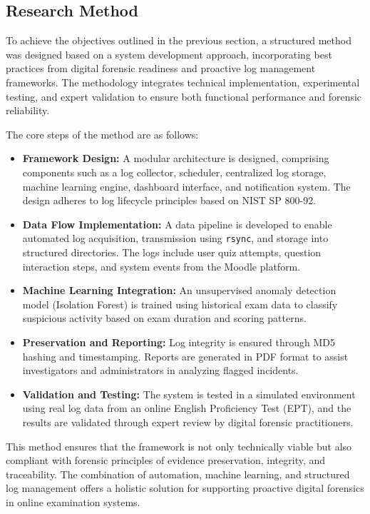 \subsection{Research Method}
To achieve the objectives outlined in the previous section, a structured method was designed based on a system development approach, incorporating best practices from digital forensic readiness and proactive log management frameworks. The methodology integrates technical implementation, experimental testing, and expert validation to ensure both functional performance and forensic reliability.

The core steps of the method are as follows:

\begin{itemize}
	\item \textbf{Framework Design:} A modular architecture is designed, comprising components such as a log collector, scheduler, centralized log storage, machine learning engine, dashboard interface, and notification system. The design adheres to log lifecycle principles based on NIST SP 800-92.
	\item \textbf{Data Flow Implementation:} A data pipeline is developed to enable automated log acquisition, transmission using \texttt{rsync}, and storage into structured directories. The logs include user quiz attempts, question interaction steps, and system events from the Moodle platform.
	\item \textbf{Machine Learning Integration:} An unsupervised anomaly detection model (Isolation Forest) is trained using historical exam data to classify suspicious activity based on exam duration and scoring patterns.
	\item \textbf{Preservation and Reporting:} Log integrity is ensured through MD5 hashing and timestamping. Reports are generated in PDF format to assist investigators and administrators in analyzing flagged incidents.
	\item \textbf{Validation and Testing:} The system is tested in a simulated environment using real log data from an online English Proficiency Test (EPT), and the results are validated through expert review by digital forensic practitioners.
\end{itemize}

This method ensures that the framework is not only technically viable but also compliant with forensic principles of evidence preservation, integrity, and traceability. The combination of automation, machine learning, and structured log management offers a holistic solution for supporting proactive digital forensics in online examination systems.

